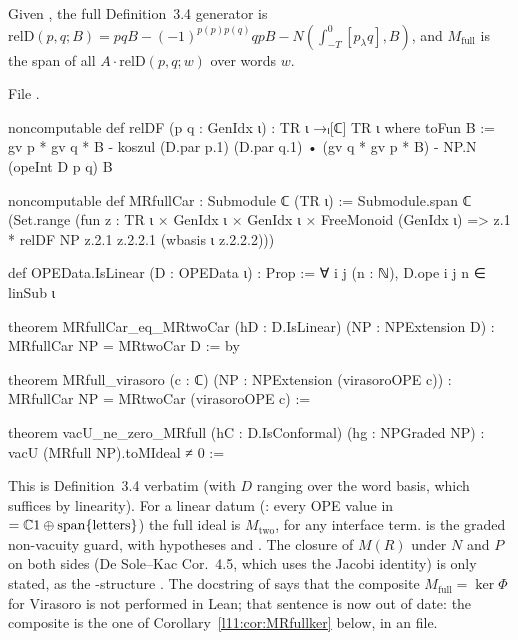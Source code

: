 \begin{definition}\label{l11:def:MRfull}
Given , the full Definition~3.4 generator is $\mathrm{relD}(p,q;B) = pqB - (-1)^{p(p)p(q)}qpB - N(\int_{-T}^0[p_\lambda q],B)$,
and $M_{\mathrm{full}}$ is the span of all $A\cdot\mathrm{relD}(p,q;w)$ over words $w$.
\end{definition}
\noindent File .
\begin{leancode}
noncomputable def relDF (p q : GenIdx ι) : TR ι →ₗ[ℂ] TR ι where
  toFun B := gv p * gv q * B - koszul (D.par p.1) (D.par q.1) • (gv q * gv p * B)
    - NP.N (opeInt D p q) B

noncomputable def MRfullCar : Submodule ℂ (TR ι) :=
  Submodule.span ℂ (Set.range
    (fun z : TR ι × GenIdx ι × GenIdx ι × FreeMonoid (GenIdx ι) =>
      z.1 * relDF NP z.2.1 z.2.2.1 (wbasis ι z.2.2.2)))

def OPEData.IsLinear (D : OPEData ι) : Prop := ∀ i j (n : ℕ), D.ope i j n ∈ linSub ι

theorem MRfullCar_eq_MRtwoCar (hD : D.IsLinear) (NP : NPExtension D) :
    MRfullCar NP = MRtwoCar D := by

theorem MRfull_virasoro (c : ℂ) (NP : NPExtension (virasoroOPE c)) :
    MRfullCar NP = MRtwoCar (virasoroOPE c) :=

theorem vacU_ne_zero_MRfull (hC : D.IsConformal) (hg : NPGraded NP) :
    vacU (MRfull NP).toMIdeal ≠ 0 :=
\end{leancode}

\begin{dictionary}
This is Definition~3.4 verbatim (with $D$ ranging over the word basis, which suffices by linearity). For a linear datum
(: every OPE value in  $={\mathbb{C}}1\oplus\operatorname{span}\{\text{letters}\}$) the full ideal is
$M_{\mathrm{two}}$, for any interface term.  is the graded non-vacuity guard, with hypotheses
 and . The closure of $M(R)$ under $N$ and $P$ on both sides (De Sole--Kac Cor.~4.5, which
uses the Jacobi identity) is only stated, as the -structure . The docstring of 
says that the composite $M_{\mathrm{full}} = \ker\Phi$ for Virasoro is not performed in Lean; that sentence is now out of date: the
composite is the one  of Corollary~\ref{l11:cor:MRfullker} below, in an  file.
\end{dictionary}

